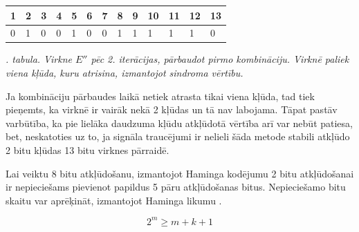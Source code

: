 \documentclass[12pt, a4paper, oneside, openright]{article}
\renewcommand{\thectables}{\arabic{ctables}}
\begin{document}
\begin{samepage}
\begin{table}[h]
\centering
\begin{tabular}{|l|l|l|l|l|l|l|l|l|l|l|l|l|}
\hline
1                         & 2                         & 3 & 4                         & 5 & 6 & 7 & 8                         & 9 & 10 & 11                        & 12 & 13                        \\ \hline
\cellcolor[HTML]{FFFFC7}0 & \cellcolor[HTML]{FFFFC7}1 & 0 & \cellcolor[HTML]{FFFFC7}0 & 1 & 0 & 0 & \cellcolor[HTML]{FFFFC7}1 & 1 & 1  & \cellcolor[HTML]{FFCCC9}1 & 1  & \cellcolor[HTML]{ECF4FF}0 \\ \hline
\end{tabular}
\end{table}
\label{ctables:hamming_1}
\begin{center}
\footnotesize{
\textit{\thectables. tabula. Virkne $E''$ pēc 2. iterācijas, pārbaudot pirmo kombināciju. Virknē paliek viena kļūda, kuru atrisina, izmantojot sindroma vērtību.}}
\end{center}
\end{samepage}

\par
Ja kombināciju pārbaudes laikā netiek atrasta tikai viena kļūda, tad tiek pieņemts, ka virknē ir vairāk nekā 2 kļūdas un
tā nav labojama. Tāpat pastāv varbūtība, ka pie lielāka daudzuma kļūdu atkļūdotā vērtība arī var nebūt patiesa,
bet, neskatoties uz to, ja signāla traucējumi ir nelieli šāda metode stabili atkļūdo 2 bitu kļūdas 13 bitu virknes pārraidē.

\par
Lai veiktu 8 bitu atkļūdošanu, izmantojot Haminga kodējumu 2 bitu atkļūdošanai ir nepieciešams
pievienot papildus 5 pāru atkļūdošanas bitus. Nepieciešamo bitu skaitu var aprēķināt, izmantojot
Haminga likumu . 

\begin{equation}\label{eq:eq_hamming}
2^m \geq m + k + 1
\end{equation}
\end{document}
